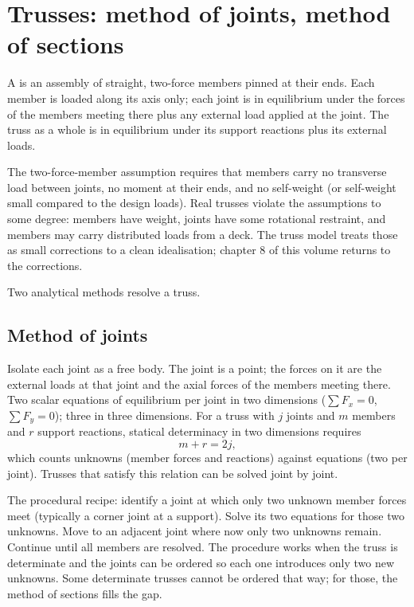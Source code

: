 \section{Trusses: method of joints, method of sections}

A  is an assembly of straight, two-force members
pinned at their ends. Each member is loaded along its axis only;
each joint is in equilibrium under the forces of the members meeting
there plus any external load applied at the joint. The truss as a
whole is in equilibrium under its support reactions plus its
external loads.

The two-force-member assumption requires that members carry no
transverse load between joints, no moment at their ends, and no
self-weight (or self-weight small compared to the design loads).
Real trusses violate the assumptions to some degree: members have
weight, joints have some rotational restraint, and members may
carry distributed loads from a deck. The truss model treats those as
small corrections to a clean idealisation; chapter 8 of this volume
returns to the corrections.

Two analytical methods resolve a truss.

\subsection{Method of joints}

Isolate each joint as a free body. The joint is a point; the forces
on it are the external loads at that joint and the axial forces of
the members meeting there. Two scalar equations of equilibrium per
joint in two dimensions ($\sum F_x = 0$, $\sum F_y = 0$); three in
three dimensions. For a truss with $j$ joints and $m$ members and
$r$ support reactions, statical determinacy in two dimensions
requires
\[
m + r = 2j,
\]
which counts unknowns (member forces and reactions) against
equations (two per joint). Trusses that satisfy this relation can be
solved joint by joint.

The procedural recipe: identify a joint at which only two unknown
member forces meet (typically a corner joint at a support). Solve
its two equations for those two unknowns. Move to an adjacent joint
where now only two unknowns remain. Continue until all members are
resolved. The procedure works when the truss is determinate and the
joints can be ordered so each one introduces only two new unknowns.
Some determinate trusses cannot be ordered that way; for those, the
method of sections fills the gap.

